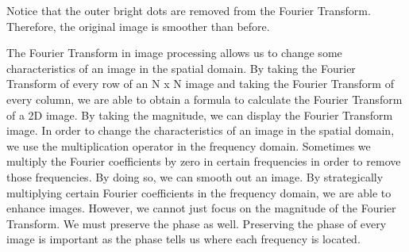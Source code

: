 \documentclass [../article.tex]{subfiles}
\begin{document}
  Notice that the outer bright dots are removed from the Fourier
  Transform.  Therefore, the original image is smoother than before.

  The Fourier Transform in image processing allows us to change some
  characteristics of an image in the spatial domain.  By taking the
  Fourier Transform of every row of an N x N image and taking the
  Fourier Transform of every column, we are able to obtain a formula
  to calculate the Fourier Transform of a 2D image.  By taking the
  magnitude, we can display the Fourier Transform image.  In order
  to change the characteristics of an image in the spatial domain,
  we use the multiplication operator in the frequency domain.
  Sometimes we multiply the Fourier coefficients by zero in certain
  frequencies in order to remove those frequencies.  By doing so, we
  can smooth out an image.  By strategically multiplying certain
  Fourier coefficients in the frequency domain, we are able to
  enhance images.  However, we cannot just focus on the magnitude of
  the Fourier Transform.  We must preserve the phase as well.
  Preserving the phase of every image is important as the phase
  tells us where each frequency is located.
\end{document}
